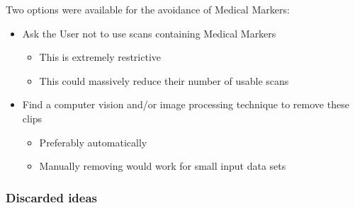 Two options were available for the avoidance of Medical Markers:
\begin{itemize}
  \item Ask the User not to use scans containing Medical Markers
  \begin{itemize}
    \item This is extremely restrictive
    \item This could massively reduce their number of usable scans
  \end{itemize}
  \item Find a computer vision and/or image processing technique to remove these clips
  \begin{itemize}
    \item Preferably automatically
    \item Manually removing would work for small input data sets
  \end{itemize}
\end{itemize}

\subsubsection{Discarded ideas}

